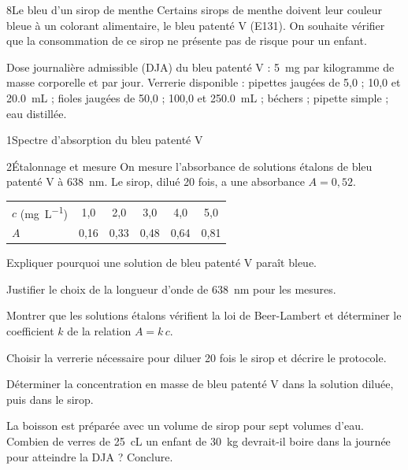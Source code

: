 

\begin{exoBac}{8}{Le bleu d'un sirop de menthe}
Certains sirops de menthe doivent leur couleur bleue à un colorant alimentaire, le bleu patenté V (E131). On souhaite
vérifier que la consommation de ce sirop ne présente pas de risque pour un enfant.
\begin{donnees}
Dose journalière admissible (DJA) du bleu patenté V : \qty{5}{mg} par kilogramme de masse corporelle et par jour. Verrerie
disponible : pipettes jaugées de 5,0 ; 10,0 et \qty{20,0}{mL} ; fioles jaugées de 50,0 ; 100,0 et \qty{250,0}{mL} ; béchers ; pipette
simple ; eau distillée.
\end{donnees}
\begin{docu}{1}{Spectre d'absorption du bleu patenté V}
\end{docu}
\begin{docu}{2}{Étalonnage et mesure}
On mesure l'absorbance de solutions étalons de bleu patenté V à \qty{638}{nm}. Le sirop, dilué 20 fois, a une absorbance $A=0{,}52$.\par\smallskip
{\centering\small\begin{tabular}{@{}lccccc@{}}\toprule
$c$ (\unit{mg.L^{-1}}) & 1,0 & 2,0 & 3,0 & 4,0 & 5,0 \\
$A$ & 0,16 & 0,33 & 0,48 & 0,64 & 0,81 \\\bottomrule
\end{tabular}\par}
\end{docu}
\begin{questions}
\item Expliquer pourquoi une solution de bleu patenté V paraît bleue.
\item Justifier le choix de la longueur d'onde de \qty{638}{nm} pour les mesures.
\item Montrer que les solutions étalons vérifient la loi de Beer-Lambert et déterminer le coefficient $k$ de la relation $A=k\,c$.
\item Choisir la verrerie nécessaire pour diluer 20 fois le sirop et décrire le protocole.
\item Déterminer la concentration en masse de bleu patenté V dans la solution diluée, puis dans le sirop.
\item \initiative La boisson est préparée avec un volume de sirop pour sept volumes d'eau. Combien de verres de \qty{25}{cL} un
enfant de \qty{30}{kg} devrait-il boire dans la journée pour atteindre la DJA ? Conclure.
\end{questions}
\end{exoBac}

